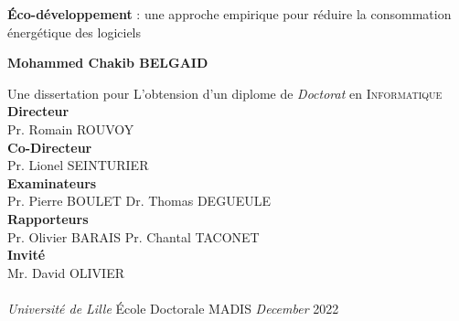 \begin{center}
    \LARGE
    \textbf{Éco-développement} : une approche empirique pour réduire la consommation énergétique des logiciels

    \vspace{.8cm}
    \Large
    \textbf{Mohammed Chakib \textsc{BELGAID}}
    \vspace{0.8cm}
    \large

    Une dissertation pour L'obtension d'un diplome de \emph{Doctorat} en \textsc{Informatique}  \\

    \vspace{0.5cm}
    \large
    \textbf{Directeur}\\
    \large
    \vspace{.5cm}
    Pr. Romain \textsc{ROUVOY}
    \endminipage
    \vspace{0.5cm}
    \large
    \\
    \textbf{Co-Directeur}\\
    \large
    \vspace{.5cm}
    Pr. Lionel \textsc{SEINTURIER}
    \endminipage
    \vspace{0.5cm}
    \\
    \large
    \textbf{Examinateurs}\\
    \large
    \vspace{.5cm}
    Pr. Pierre \textsc{BOULET} \newline
    Dr. Thomas \textsc{DEGUEULE}
    \endminipage
    \vspace{.5cm}
    \\
    \large
    \textbf{Rapporteurs}\\
    \large
    \vspace{.5cm}
    Pr. Olivier \textsc{BARAIS} \newline
    Pr. Chantal \textsc{TACONET}
    \endminipage
    \vspace{0.5cm}
    \\
    \large
    \textbf{Invité}\\
    \large
    \vspace{.5cm}
    Mr. David \textsc{OLIVIER}\\
    \endminipage
    \vspace{0.5cm}
    \\
    \Large
    \emph{Université de Lille}
    \'Ecole Doctorale MADIS
    \endminipage
    \emph{December} 2022
    \endminipage



\end{center}